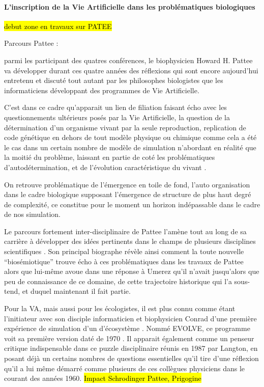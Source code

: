 \paragraph{L'inscription de la Vie Artificielle dans les problématiques biologiques}
\label{p:va_bio}

\hl{debut zone en travaux sur PATEE}

Parcours Pattee :

parmi les participant des quatres conférences, le biophysicien Howard H. Pattee va développer durant ces quatre années des réflexions qui sont encore aujourd'hui entretenu et discuté tout autant par les philosophes biologistes que les informaticiens développant des programmes de Vie Artificielle.

C'est dans ce cadre qu'apparait un lien de filiation faisant écho avec les questionnements ultérieurs posés par la Vie Artificielle, la question de la détermination d'un organisme vivant par la seule reproduction, replication de code génétique en dehors de tout modèle physique ou chimique comme cela a été le cas dans un certain nombre de modèle de simulation n'abordant en réalité que la moitié du problème, laissant en partie de coté les problématiques d'autodétermination, et de l'évolution caractéristique du vivant \autocite{Mossio}.

On retrouve problématique de l'émergence en toile de fond, l'auto organisation dans le cadre biologique supposant l'émergence de structure de plus haut degré de complexité, ce constitue pour le moment un horizon indépassable dans le cadre de nos simulation.


Le parcours fortement inter-disciplinaire de Pattee l'amène tout au long de sa carrière à développer des idées pertinents dans le champs de plusieurs disciplines scientifiques \textcite{Umerez2001}. Son principal biographe  \textcite{Umerez2009} révèle ainsi comment la toute nouvelle \enquote{biosémiotique} trouve écho à ces problématiques dans les travaux de Pattee alors que lui-même avoue dans une réponse à Umerez \autocite{Pattee2009} qu'il n'avait jusqu'alors que peu de connaissance de ce domaine, de cette trajectoire historique qui l'a sous-tend, et duquel maintenant il fait partie.

Pour la VA, mais aussi pour les écologistes, il est plus connu comme étant l'initiateur avec son disciple informaticien et biophysicien Conrad d'une première expérience de simulation d'un d'écosystème . Nommé EVOLVE, ce programme  voit sa première version daté de 1970 \autocites{Conrad1970, Pattee2002}. Il apparait également comme un penseur critique indispensable dans ce puzzle disciplinaire réunis en 1987 par Langton, en posant déjà un certains nombres de questions essentielles qu'il tire d'une réflexion qu'il a lui même démarré comme plusieurs de ces collègues physiciens dans le courant des années 1960. \hl{Impact Schrodinger Pattee, Prigogine} \autocite{Pattee1988}

